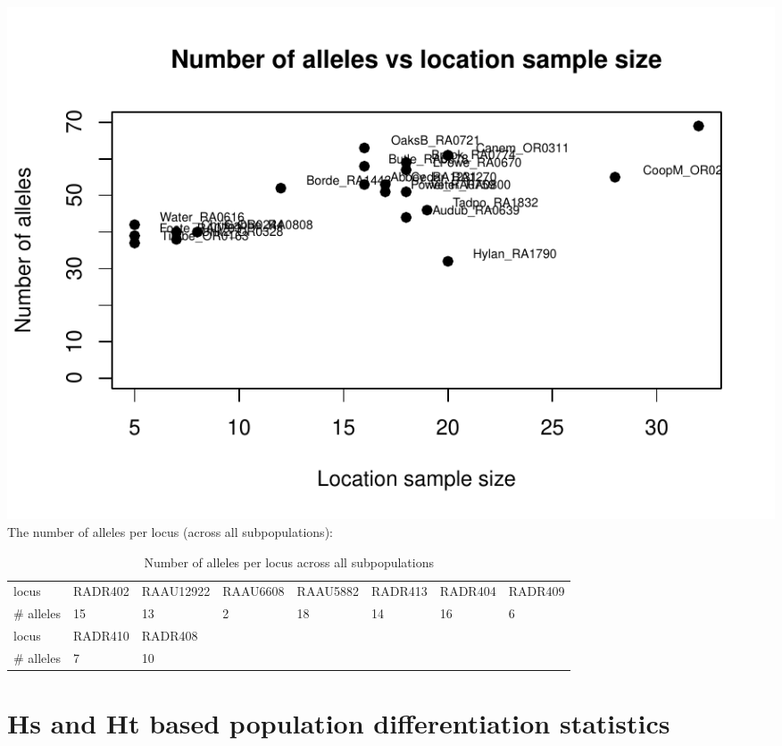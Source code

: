 \documentclass[a4paper]{scrartcl}\usepackage[]{graphicx}\usepackage[]{color}
\makeatletter
\def\maxwidth{ %
  \ifdim\Gin@nat@width>\linewidth
    \linewidth
  \else
    \Gin@nat@width
  \fi
}
\newenvironment{knitrout}{}{} %
\makeatother
\begin{document}
\begin{knitrout}
\color{fgcolor}
\includegraphics[width=\maxwidth]{PopGenReport-pop_sampsz_vs_alleles-1} 
\end{knitrout}
\FloatBarrier
\noindent
\newline The number of alleles per locus (across all subpopulations):


\begin{table}[ht]
\centering
\begin{tabular}{llllllll}
   \hline
locus & RADR402 & RAAU12922 & RAAU6608 & RAAU5882 & RADR413 & RADR404 & RADR409 \\ 
   \rowcolor[gray]{0.9} \# alleles & 15 & 13 & 2 & 18 & 14 & 16 & 6 \\ 
  locus & RADR410 & RADR408 &  &  &  &  &  \\ 
   \rowcolor[gray]{0.9} \# alleles & 7 & 10 &  &  &  &  &  \\ 
   \hline
\end{tabular}
\caption{Number of alleles per locus across all subpopulations} 
\end{table}







\FloatBarrier


\section{Hs and Ht based population differentiation statistics}
\end{document}
